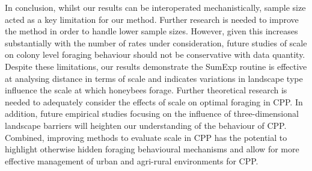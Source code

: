 \documentclass[11pt,usenames,dvipsnames]{article}
\begin{document}
In conclusion, whilst our results can be interoperated mechanistically, sample size acted as a key limitation for our method. Further research is needed to improve the method in order to handle lower sample sizes. However, given this increases substantially with the number of rates under consideration, future studies of scale on colony level foraging behaviour should not be conservative with data quantity. Despite these limitations, our results demonstrate the SumExp routine is effective at analysing distance in terms of scale and indicates variations in landscape type influence the scale at which honeybees forage. Further theoretical research is needed to adequately consider the effects of scale on optimal foraging in CPP. In addition, future empirical studies focusing on the influence of three-dimensional landscape barriers will heighten our understanding of the behaviour of CPP. Combined, improving methods to evaluate scale in CPP has the potential to highlight otherwise hidden foraging behavioural mechanisms and allow for more effective management of urban and agri-rural environments for CPP. 




\end{document}
